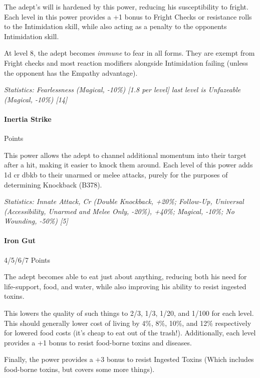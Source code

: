 \begin{multicols*}{3}
		The adept's will is hardened by this power, reducing his susceptibility to fright. Each level in this power provides a +1 bonus to Fright Checks or resistance rolls to the Intimidation skill, while also acting as a penalty to the opponents Intimidation skill. 
		
		At level 8, the adept becomes \textit{immune} to fear in all forms. They are exempt from Fright checks and most reaction modifiers alongside Intimidation failing (unless the opponent has the Empathy advantage).

		\textcolor{OliveGreen}{\textit{Statistics: Fearlessness (Magical, -10\%) [1.8 per level] last level is Unfazeable (Magical, -10\%) [14] }}

	\paragraph{Inertia Strike}
	\begin{flushright}
		Points
	\end{flushright}

		This power allows the adept to channel additional momentum into their target after a hit, making it easier to knock them around. Each level of this power adds 1d cr dbkb to their unarmed or melee attacks, purely for the purposes of determining Knockback (B378).

		\textcolor{OliveGreen}{\textit{Statistics: Innate Attack, Cr (Double Knockback, +20\%; Follow-Up, Universal (Accessibility, Unarmed and Melee Only, -20\%), +40\%; Magical, -10\%; No Wounding, -50\%) [5] }}
	
	\paragraph{Iron Gut}
	\begin{flushright}
		4/5/6/7 Points
	\end{flushright}

		The adept becomes able to eat just about anything, reducing both his need for life-support, food, and water, while also improving his ability to resist ingested toxins. 
		
		This lowers the quality of such things to 2/3, 1/3, 1/20, and 1/100 for each level. This should generally lower cost of living by 4\%, 8\%, 10\%, and 12\% respectively for lowered food costs (it's cheap to eat out of the trash!). Additionally, each level provides a +1 bonus to resist food-borne toxins and diseases.
		
		Finally, the power provides a +3 bonus to resist Ingested Toxins (Which includes food-borne toxins, but covers some more things).


\end{multicols*}
